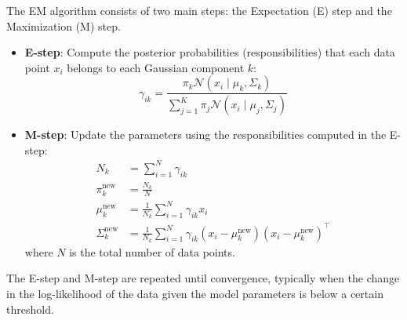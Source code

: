 The EM algorithm consists of two main steps: the Expectation (E) step and the Maximization (M) step.
\begin{itemize}
    \item \textbf{E-step}:
        Compute the posterior probabilities (responsibilities) that each data point \( x_i \) belongs to each Gaussian component \( k \):
        \begin{equation*}
            \gamma_{ik}
            =
            \frac{\pi_k \mathcal{N}(x_i \mid \mu_k, \Sigma_k)}
            {\sum_{j=1}^{K} \pi_j \mathcal{N}(x_i \mid \mu_j, \Sigma_j)}
        \end{equation*}

    \item \textbf{M-step}:
        Update the parameters using the responsibilities computed in the E-step:
        \begin{align*}
            N_k
            & =
            \sum_{i=1}^{N} \gamma_{ik}
            \\
            \pi_k^{\text{new}}
            & =
            \frac{N_k}{N}
            \\
            \mu_k^{\text{new}}
            & =
            \frac{1}{N_k} \sum_{i=1}^{N} \gamma_{ik} x_i
            \\
            \Sigma_k^{\text{new}}
            & =
            \frac{1}{N_k}
            \sum_{i=1}^{N} \gamma_{ik} (x_i - \mu_k^{\text{new}}) {(x_i - \mu_k^{\text{new}})}^\top
        \end{align*}
        where \( N \) is the total number of data points.
\end{itemize}

The E-step and M-step are repeated until convergence, typically when the change in the log-likelihood of the data given the model parameters is below a certain threshold.
